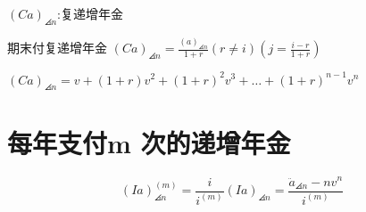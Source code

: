 $(Ca)_{\angles{n}}$:复递增年金
\begin{definition}{期末付复递增年金}
\noindent $(Ca)_{\angles{n}}=\frac{(a)_{\angles{n}}}{1+r}(r\neq i)(j=\frac{i-r}{1+r})$
\end{definition}
\begin{remark}
\noindent $(Ca)_{\angles{n}}=v+(1+r)v^2+(1+r)^2v^3+\dots+ (1+r)^{n-1}v^n$
\end{remark}

\section{每年支付m 次的递增年金}
$$(I a)_{\angles{n}}^{(m)}=\frac{i}{i^{(m)}}(I a)_{\angles{n}}=\frac{\ddot{a}_{\angles{n}}-n v^{n}}{i^{(m)}}$$
